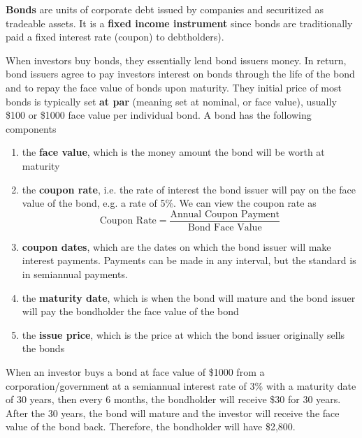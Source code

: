 \documentclass{article}
\begin{document}
    \begin{definition}[Bond]
      \textbf{Bonds} are units of corporate debt issued by companies and securitized as tradeable assets. It is a \textbf{fixed income instrument} since bonds are traditionally paid a fixed interest rate (coupon) to debtholders). 

      When investors buy bonds, they essentially lend bond issuers money. In return, bond issuers agree to pay investors interest on bonds through the life of the bond and to repay the face value of bonds upon maturity. They initial price of most bonds is typically set \textbf{at par} (meaning set at nominal, or face value), usually \$100 or \$1000 face value per individual bond. A bond has the following components
      \begin{enumerate}
        \item the \textbf{face value}, which is the money amount the bond will be worth at maturity
        \item the \textbf{coupon rate}, i.e. the rate of interest the bond issuer will pay on the face value of the bond, e.g. a rate of 5\%. We can view the coupon rate as 
        \[\text{Coupon Rate} = \frac{\text{Annual Coupon Payment}}{\text{Bond Face Value}}\]
        \item \textbf{coupon dates}, which are the dates on which the bond issuer will make interest payments. Payments can be made in any interval, but the standard is in semiannual payments. 
        \item the \textbf{maturity date}, which is when the bond will mature and the bond issuer will pay the bondholder the face value of the bond 
        \item the \textbf{issue price}, which is the price at which the bond issuer originally sells the bonds
      \end{enumerate}
      When an investor buys a bond at face value of \$1000 from a corporation/government at a semiannual interest rate of 3\% with a maturity date of 30 years, then every 6 months, the bondholder will receive \$30 for 30 years. After the 30 years, the bond will mature and the investor will receive the face value of the bond back. Therefore, the bondholder will have \$2,800. 
    \end{definition}
\end{document}
